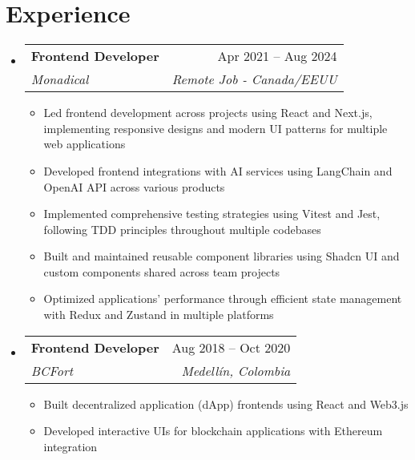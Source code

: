 \documentclass[letterpaper,11pt]{article}
\makeatletter
\newcommand{\resumeSubheading}[4]{
  \vspace{-2pt}
  \item[]
  \begin{tabular*}{\textwidth}{@{\extracolsep{\fill}}l r}
    \textbf{#1} & #2 \\
    \textit{#3} & \textit{#4} \\
  \end{tabular*}
  \vspace{-5pt}
}
\makeatother
\begin{document}
\section{Experience}
\begin{itemize}[leftmargin=0pt, itemindent=0pt, label={}]
\resumeSubheading
{Frontend Developer}{Apr 2021 -- Aug 2024}
{Monadical}{Remote Job - Canada/EEUU}
\begin{itemize}[leftmargin=*]
\item Led frontend development across projects using React and Next.js, implementing responsive designs and modern UI patterns for multiple web applications
\item Developed frontend integrations with AI services using LangChain and OpenAI API across various products
\item Implemented comprehensive testing strategies using Vitest and Jest, following TDD principles throughout multiple codebases
\item Built and maintained reusable component libraries using Shadcn UI and custom components shared across team projects
\item Optimized applications' performance through efficient state management with Redux and Zustand in multiple platforms
\end{itemize}

\resumeSubheading
{Frontend Developer}{Aug 2018 -- Oct 2020}
{BCFort}{Medellín, Colombia}
\begin{itemize}[leftmargin=*]
    \item Built decentralized application (dApp) frontends using React and Web3.js
    \item Developed interactive UIs for blockchain applications with Ethereum integration
\end{itemize}
\end{itemize}
\end{document}
